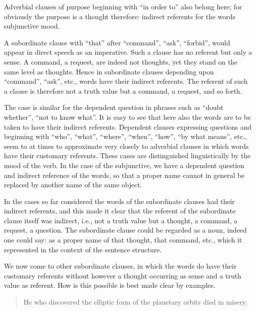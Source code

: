 \documentclass[twoside,12pt]{article}
\begin{document}
Adverbial clauses of purpose beginning with ``in order to'' also
belong here; for obviously the purpose is a thought therefore:
indirect referents for the words subjunctive mood.

A subordinate clause with ``that'' after ``command'', ``ask'',
``forbid'', would appear in direct speech as an imperative. Such a
clause has no referent but only a sense. A command, a request, are
indeed not thoughts, yet they stand on the same level as thoughts.
Hence in subordinate  clauses depending upon
``command'', ``ask'', etc., words have their indirect referents. The
referent of such a clause is therefore not a truth value but a
command, a request, and so forth.

The case is similar for the dependent question in phrases such as
``doubt whether'', ``not to know what''. It is easy to see that here
also the words are to be taken to have their indirect referents.
Dependent clauses expressing questions and beginning with ``who'',
``what'', ``where'', ``when'', ``how'', ``by what means'', etc., seem
to at times to approximate very closely to adverbial clauses in which
words have their customary referents. These cases are distinguished
linguistically by the mood of the verb. In the case of the
subjunctive, we have a dependent question and indirect reference of
the words, so that a proper name cannot in general be replaced by
another name of the same object.

In the cases so far considered the words of the subordinate clauses
had their indirect referents, and this made it clear that the referent
of the subordinate clause itself was indirect, i.e., not a truth value
but a thought, a command, a request, a question. The subordinate
clause could be regarded as a noun, indeed one could say: as a proper
name of that thought, that command, etc., which it represented in the
context of the sentence structure.

We now come to other subordinate clauses, in which the words do have
their customary referents without however a thought occurring as sense
and a truth value as referent. How is this possible is best made clear
by examples.

\begin{quote}
  He who discovered the elliptic form of the planetary orbits died in misery.
\end{quote}
\end{document}
